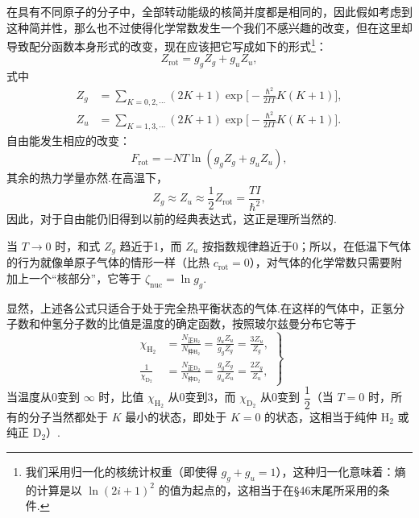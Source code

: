在具有不同原子的分子中，全部转动能级的核简并度都是相同的，因此假如考虑到这种简并性，那么也不过使得化学常数发生一个我们不感兴趣的改变，但在这里却导致配分函数本身形式的改变，现在应该把它写成如下的形式\footnote{我们采用归一化的核统计权重（即使得 $g_g+g_u=1$），这种归一化意味着：熵的计算是以 $\ln(2i+1)^2$ 的值为起点的，这相当于在§46末尾所采用的条件.}：
\begin{equation}
  Z_{\mathrm{rot}}=g_gZ_g+g_uZ_u,
\end{equation}
式中
\begin{equation}
\begin{aligned}
  Z_g&=\sum_{K=0,2,\cdots}\left(2K+1\right)
  \exp\Big[-\frac{\hbar^2}{2IT}K(K+1)\Big],\\
  Z_u&=\sum_{K=1,3,\cdots}\left(2K+1\right)
  \exp\Big[-\frac{\hbar^2}{2IT}K(K+1)\Big].
\end{aligned}
\end{equation}
自由能发生相应的改变：
\begin{equation}
  F_{\mathrm{rot}}=-NT\ln\left(g_gZ_g+g_uZ_u\right),
\end{equation}
其余的热力学量亦然.在高温下，
\begin{equation*}
  Z_g\approx Z_u\approx\frac{1}{2}Z_{\mathrm{rot}}=\frac{TI}{\hbar^2},
\end{equation*}
因此，对于自由能仍旧得到以前的经典表达式，这正是理所当然的.

当 $T\to0$ 时，和式 $Z_g$ 趋近于1，而 $Z_u$ 按指数规律趋近于0；所以，在低温下气体的行为就像单原子气体的情形一样（比热 $c_{\mathrm{rot}}=0$），对气体的化学常数只需要附加上一个“核部分”，它等于 $\zeta_{\mathrm{nuc}}=\ln g_g$.

显然，上述各公式只适合于处于完全热平衡状态的气体.在这样的气体中，正氢分子数和仲氢分子数的比值是温度的确定函数，按照玻尔兹曼分布它等于
\begin{equation}
  \left.
  \begin{aligned}
    \chi_{\mathrm{H}_2}&=\frac{N_{\text{正}\mathrm{H}_2}}{N_{\text{仲}\mathrm{H}_2}}
    =\frac{g_uZ_u}{g_gZ_g}=\frac{3Z_u}{Z_g},\\
    \frac{1}{\chi_{\mathrm{D}_2}}&=\frac{N_{\text{正}\mathrm{D}_2}}{N_{\text{仲}\mathrm{D}_2}}
    =\frac{g_gZ_g}{g_uZ_u}=\frac{2Z_g}{Z_u},
  \end{aligned}
  \right\}
\end{equation}
当温度从0变到 $\infty$ 时，比值 $\chi_{\mathrm{H}_2}$ 从0变到3，而 $\chi_{\mathrm{D}_2}$ 从0变到 $\dfrac{1}{2}$（当 $T=0$ 时，所有的分子当然都处于 $K$ 最小的状态，即处于 $K=0$ 的状态，这相当于纯仲 $\mathrm{H}_2$ 或纯正 $\mathrm{D}_2$）.

